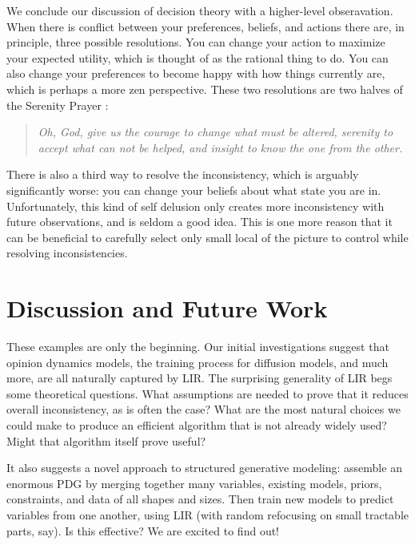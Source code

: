 We conclude our discussion of decision theory with a higher-level obseravation. 
When there is conflict between your preferences, beliefs, and actions
%
there are, in principle, three possible resolutions.
You can change your action to maximize your expected utility, which is thought of as the rational thing to do.
You can also change your preferences to become happy with how things currently are, which is perhaps a more zen perspective. 
These two resolutions are two halves of the Serenity Prayer \citep{serenity-prayer}:

\begin{quotation}\it
    Oh, God, give us the courage to change what must be altered, serenity to accept what can not be helped, and insight to know the one from the other.
\end{quotation}

There is also a third way to resolve the inconsistency, which is arguably significantly worse: you can change your beliefs about what state you are in. 
Unfortunately, this kind of self delusion only creates more inconsistency with future observations, and is seldom a good idea.  
This is one more reason that it can be beneficial to carefully select only small local of the picture to control while resolving inconsistencies.


\section{Discussion and Future Work}

These examples are only the beginning.
Our initial investigations suggest that
opinion dynamics models,
the training process for diffusion models,
and much more, are all naturally captured by LIR.
%
The surprising generality of LIR begs some theoretical questions.
What assumptions are needed to prove that it reduces overall inconsistency,
    as is often the case?
What are the most natural choices we could make to produce an efficient
    algorithm that is not already widely used?
    Might that algorithm itself prove useful?

It also suggests a novel approach to structured generative modeling:
assemble an enormous PDG by merging together
    many variables, existing models, priors,
    constraints, and data of all shapes and sizes.
Then train new models to predict variables from one another,
    using LIR (with random refocusing on small tractable parts, say).
Is this effective?  We are excited to find out!

